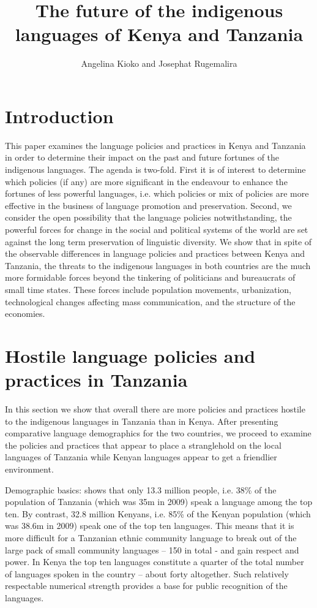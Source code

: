 \documentclass[output=paper,colorlinks,citecolor=brown]{langscibook}
\author{Angelina Kioko\affiliation{US International University-Africa} and Josephat Rugemalira \affiliation{Tumaini University College Dar es Salaam}}
\title{The future of the indigenous languages of Kenya and Tanzania}
\begin{document}
\maketitle

\section{Introduction}\label{sec:kioko:1}

This paper examines the language policies and practices in Kenya and Tanzania in order to determine their impact on the past and future fortunes of the indigenous languages. The agenda is two-fold. First it is of interest to determine which policies (if any) are more significant in the endeavour to enhance the fortunes of less powerful languages, i.e. which policies or mix of policies are more effective in the business of language promotion and preservation. Second, we consider the open possibility that the language policies notwithstanding, the powerful forces for change in the social and political systems of the world are set against the long term preservation of linguistic diversity. We show that in spite of the observable differences in language policies and practices between Kenya and Tanzania, the threats to the indigenous languages in both countries are the much more formidable forces beyond the tinkering of politicians and bureaucrats of small time states. These forces include population movements, urbanization, technological changes affecting mass communication, and the structure of the economies.

\section{Hostile language policies and practices in Tanzania}\label{sec:kioko:2}

In this section we show that overall there are more policies and practices hostile to the indigenous languages in Tanzania than in Kenya. After presenting comparative language demographics for the two countries, we proceed to examine the policies and practices that appear to place a stranglehold on the local languages of Tanzania while Kenyan languages appear to get a friendlier environment.

Demographic basics:  shows that only 13.3 million people, i.e. 38\% of the population of Tanzania (which was 35m in 2009) speak a language among the top ten. By contrast, 32.8 million Kenyans, i.e.  85\% of the Kenyan population (which was 38.6m in 2009) speak one of the top ten languages. This means that it is more difficult for a Tanzanian ethnic community language to break out of the large pack of small community languages – 150 in total - and gain respect and power. In Kenya the top ten languages constitute a quarter of the total number of languages spoken in the country – about forty altogether. Such relatively respectable numerical strength provides a base for public recognition of the languages.
\end{document}
